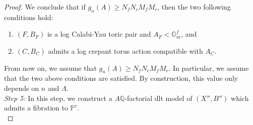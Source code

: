 \documentclass{amsart}
\newcommand{\pp}{\mathbb{P}}
\renewcommand{\qq}{\mathbb{Q}}
\theoremstyle{remark}
\numberwithin{equation}{section}
\begin{document}
\begin{proof}
We conclude that
if $g_n(A)\geq N_fN_cM_fM_c$, 
then the two following conditions hold:
\begin{enumerate}
\item $(F,B_F)$ is a log Calabi-Yau toric pair
and $A_F<\mathbb{G}_m^f$, and
\item $(C,B_C)$ admits a log crepant torus action compatible with $A_C$.
\end{enumerate}
From now on, we assume that
$g_n(A)\geq N_fN_cM_fM_c$.
In particular, we assume that the two above conditions are satisfied.
By construction, this value only depends on $n$
and $\Lambda$.\\

\textit{Step 5:} In this step, we construct a $A\qq$-factorial dlt model of
$(X'',B'')$ which admits a fibration to $\pp^c$.\\


\end{proof}
\end{document}
